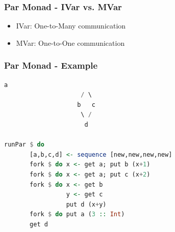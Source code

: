 \documentclass[12pt, danish]{beamer}
\begin{document}
\begin{frame}
  \frametitle{Par Monad - IVar vs. MVar}
  \begin{itemize}
    \item IVar: One-to-Many communication
    \item MVar: One-to-One communication
  \end{itemize}
\end{frame}

\begin{frame}[fragile]
  \frametitle{Par Monad - Example}
  \begin{lstlisting}[language=Haskell]
                      a
                     / \  
                    b   c
                     \ /
                      d
  
runPar $ do
       [a,b,c,d] <- sequence [new,new,new,new]
       fork $ do x <- get a; put b (x+1)
       fork $ do x <- get a; put c (x+2)
       fork $ do x <- get b
                 y <- get c 
                 put d (x+y)
       fork $ do put a (3 :: Int)
       get d
  \end{lstlisting}
\end{frame}
\end{document}
